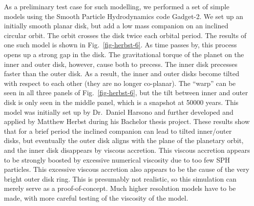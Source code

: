 \documentclass[10pt,fleqn,twoside,a4paper]{article}
\begin{document}
As a preliminary test case for such modelling, we performed a set of simple
models using the Smooth Particle Hydrodynamics code Gadget-2. We set up an
initially smooth planar disk, but add a low mass companion on an inclined
circular orbit. The orbit crosses the disk twice each orbital period. The
results of one such model is shown in Fig.~\ref{fig-herbst-6}. As time
passes by, this process opens up a strong gap in the disk. The gravitational
torque of the planet on the inner and outer disk, however, cause both to
precess. The inner disk precesses faster than the outer disk. As a result,
the inner and outer disks become tilted with respect to each other (they are
no longer co-planar). The ``warp'' can be seen in all three panels of
Fig.~\ref{fig-herbst-6}, but the tilt between inner and outer disk is only
seen in the middle panel, which is a snapshot at 50000 years. This model was
initially set up by Dr.~Daniel Harsono and further developed and applied by
Matthew Herbst during his Bachelor thesis project. These results show that
for a brief period the inclined companion can lead to tilted inner/outer
disks, but eventually the outer disk aligns with the plane of the planetary
orbit, and the inner disk disappears by viscous accretion. This viscous
accretion appears to be strongly boosted by excessive numerical viscosity
due to too few SPH particles. This excessive viscous accretion also appears
to be the cause of the very bright outer disk ring. This is presumably not
realistic, so this simulation can merely serve as a proof-of-concept. Much
higher resolution models have to be made, with more careful testing of the
viscosity of the model.
\end{document}
